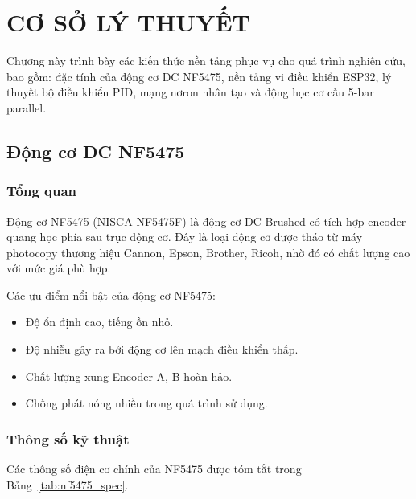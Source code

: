 
\chapter{CƠ SỞ LÝ THUYẾT}
\label{chap:cosolythuyet}

Chương này trình bày các kiến thức nền tảng phục vụ cho quá trình nghiên cứu,
bao gồm: đặc tính của động cơ DC NF5475, nền tảng vi điều khiển ESP32, lý thuyết
bộ điều khiển PID, mạng nơron nhân tạo và động học cơ cấu 5-bar parallel.


\section{Động cơ DC NF5475}

\subsection{Tổng quan}

Động cơ NF5475 (NISCA NF5475F) là động cơ DC Brushed có tích hợp encoder quang học
phía sau trục động cơ. Đây là loại động cơ được tháo từ máy photocopy thương hiệu
Cannon, Epson, Brother, Ricoh, nhờ đó có chất lượng cao với mức giá phù hợp.

Các ưu điểm nổi bật của động cơ NF5475:
\begin{itemize}
    \item Độ ổn định cao, tiếng ồn nhỏ.
    \item Độ nhiễu gây ra bởi động cơ lên mạch điều khiển thấp.
    \item Chất lượng xung Encoder A, B hoàn hảo.
    \item Chống phát nóng nhiều trong quá trình sử dụng.
\end{itemize}

\subsection{Thông số kỹ thuật}

Các thông số điện cơ chính của NF5475 được tóm tắt trong Bảng~\ref{tab:nf5475_spec}.

